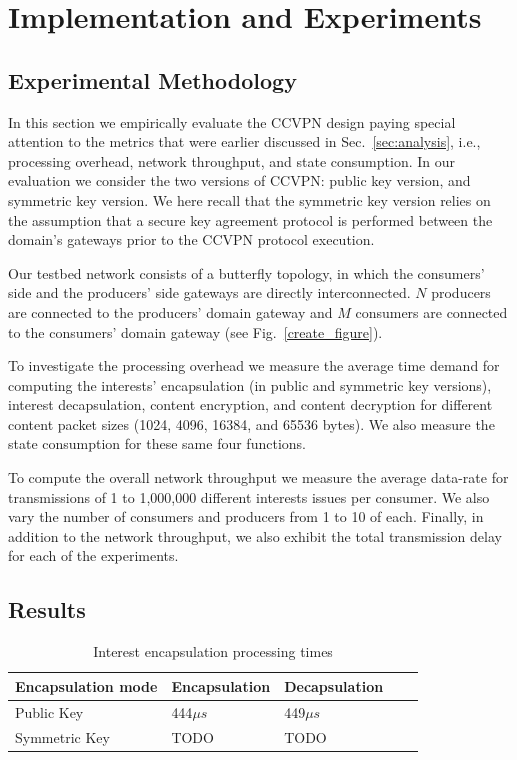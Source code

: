 \section{Implementation and Experiments}

\subsection{Experimental Methodology}

In this section we empirically evaluate the CCVPN design paying special attention to the metrics that were earlier discussed in Sec.~\ref{sec:analysis}, i.e., processing overhead, network throughput, and state consumption. In our evaluation we consider the two versions of CCVPN: public key version, and symmetric key version. We here recall that the symmetric key version relies on the assumption that a secure key agreement protocol is performed between the domain's gateways prior to the CCVPN protocol execution.

Our testbed network consists of a butterfly topology, in which the consumers' side and the producers' side gateways are directly interconnected. $N$ producers are connected to the producers' domain gateway and $M$ consumers are connected to the consumers' domain gateway (see Fig.~\ref{create_figure}).

To investigate the processing overhead we measure the average time demand for computing the interests' encapsulation (in public and symmetric key versions), interest decapsulation, content encryption, and content decryption for different content packet sizes (1024, 4096, 16384, and 65536 bytes). We also measure the state consumption for these same four functions.

To compute the overall network throughput we measure the average data-rate for transmissions of 1 to 1,000,000 different interests issues per consumer. We also vary the number of consumers and producers from 1 to 10 of each. Finally, in addition to the network throughput, we also exhibit the total transmission delay for each of the experiments.

\subsection{Results}


\begin{table}[!h]
\centering
\caption{Interest encapsulation processing times}
\label{my-label}
\begin{tabular}{|l|l|l|l|l|}
\hline
Encapsulation mode   & Encapsulation & Decapsulation \\ \hline
Public Key  & 444$\mu s$           & 449$\mu s$           \\ \hline \cline{4-5} 
Symmetric Key & TODO          & TODO          \\ \hline
\end{tabular}
\end{table}




